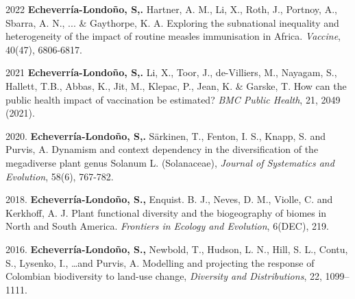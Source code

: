\documentclass[ letterpaper]{twentysecondcv} %
\begin{document}
2022 \textbf{Echeverr\'ia-Londo\~no, S,.}  Hartner, A. M., Li, X., Roth, J., Portnoy, A., Sbarra, A. N., ... \& Gaythorpe, K. A. Exploring the subnational inequality and heterogeneity of the impact of routine measles immunisation in Africa. \textit{Vaccine}, 40(47), 6806-6817. 

2021 \textbf{Echeverr\'ia-Londo\~no, S,.}  Li, X., Toor, J., de-Villiers, M., Nayagam, S., Hallett, T.B., Abbas, K., Jit, M., Klepac, P., Jean, K. \&  Garske, T. How can the public health impact of vaccination be estimated? \textit{BMC Public Health}, 21, 2049 (2021).

2020. \textbf{Echeverr\'ia-Londo\~no, S,.}  S{\"a}rkinen, T., Fenton, I. S., Knapp, S. and Purvis, A. Dynamism and context dependency in the diversification of the megadiverse plant genus Solanum L. (Solanaceae), \textit{Journal of Systematics and Evolution},  58(6), 767-782. 

2018. \textbf{Echeverr\'ia-Londo\~no, S.,} Enquist. B. J., Neves, D. M., Violle, C. and Kerkhoff, A. J. Plant functional diversity and the biogeography of biomes in North and South America. \textit{Frontiers in Ecology and Evolution}, 6(DEC), 219.

2016. \textbf{Echeverr\'ia-Londo\~no, S.,} Newbold, T., Hudson, L. N., Hill, S. L., Contu, S., Lysenko, I., \dots and Purvis, A. Modelling and projecting the response of Colombian biodiversity to land-use change, \textit{Diversity and Distributions}, 22, 1099--1111. 
\end{document}
